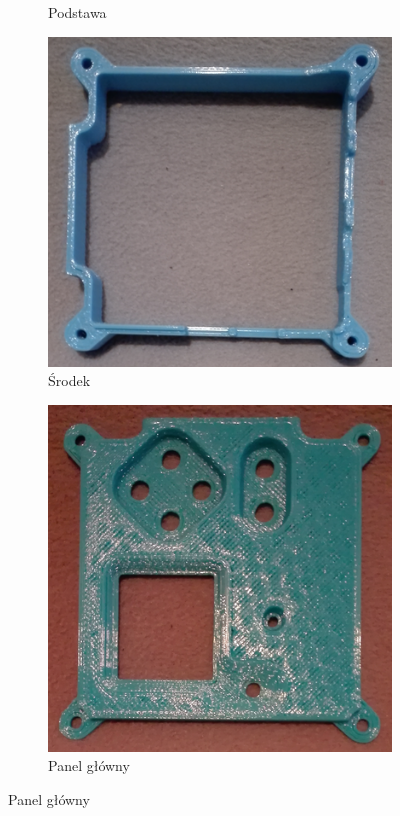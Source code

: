 \begin{figure}[H]
\begin{subfigure}{0.24\textwidth}
        \caption*{Podstawa}
    \end{subfigure}
    \begin{subfigure}{0.24\textwidth}
        \centering
        \includegraphics[width=0.9\linewidth]{photos/part3.png}
        \caption*{Środek}
    \end{subfigure}
    \begin{subfigure}{0.24\textwidth}
        \centering
        \includegraphics[width=0.9\linewidth]{photos/part4.png}
        \caption*{Panel główny}
    \end{subfigure}
\end{figure}

